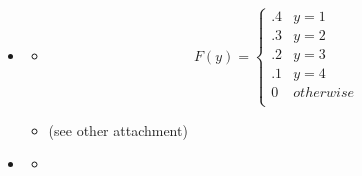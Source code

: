\documentclass{article}
\begin{document}
\begin{itemize}

	\item[\textbf{4.1}]\begin{itemize}
			\item[\textbf{a}] \[ F(y)=\begin{cases}
					.4 & y=1 \\
					.3 & y=2 \\
					.2 & y=3 \\
					.1 & y=4 \\
					0 & otherwise \\
				\end{cases}
				\]
			\item[\textbf{b}] (see other attachment)
		\end{itemize}
	\item[\textbf{4.8}] \begin{itemize}
		\item[\textbf{a}] 
	\end{itemize}

\end{itemize}
\end{document}
